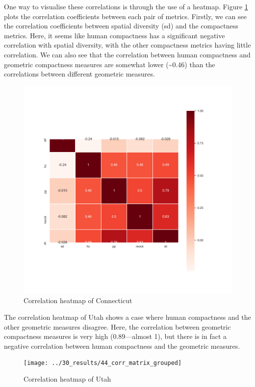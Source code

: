 \documentclass[]{article}
\begin{document}
One way to visualise these correlations is through the use of a heatmap.
Figure \ref{connecticut_corr} plots the correlation coefficients between
each pair of metrics. Firstly, we can see the correlation coefficients
between spatial diversity (sd) and the compactness metrics. Here, it
seems like human compactness has a significant negative correlation with
spatial diversity, with the other compactness metrics having little
correlation. We can also see that the correlation between human
compactness and geometric compactness measures are somewhat lower
(\textasciitilde{}0.46) than the correlations between different
geometric measures.

\begin{figure}
\centering
\includegraphics{../30_results/09_corr_matrix_grouped}
\caption{Correlation heatmap of Connecticut \label{connecticut_corr}}
\end{figure}

The correlation heatmap of Utah shows a case where human compactness and
the other geometric measures disagree. Here, the correlation between
geometric compactness measures is very high (0.89---almost 1), but there
is in fact a negative correlation between human compactness and the
geometric measures.

\begin{figure}
\centering
\texttt{[image: ../30\_results/44\_corr\_matrix\_grouped]}
\caption{Correlation heatmap of Utah}
\end{figure}
\end{document}
